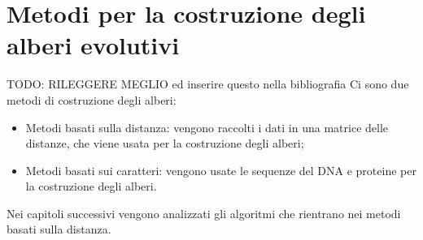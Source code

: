 \section{Metodi per la costruzione degli alberi evolutivi}
TODO: RILEGGERE MEGLIO ed inserire questo nella bibliografia %
Ci sono due metodi di costruzione degli alberi:
\begin{itemize}
	\item Metodi basati sulla distanza: vengono raccolti i dati in una matrice delle distanze, che viene usata per la costruzione degli alberi;
	\item Metodi basati sui caratteri: vengono usate le sequenze del DNA e proteine per la costruzione degli alberi.
\end{itemize}
Nei capitoli successivi vengono analizzati gli algoritmi che rientrano nei metodi basati sulla distanza.
